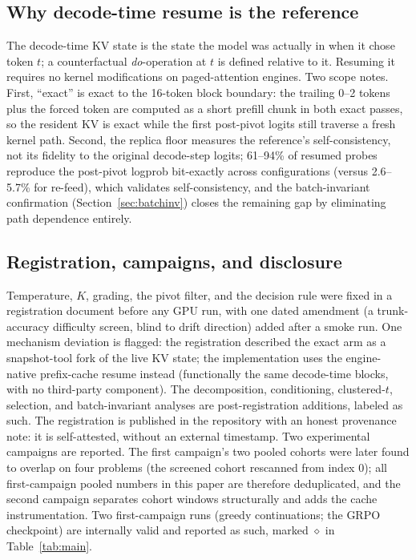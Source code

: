 \documentclass[11pt]{article}
\begin{document}
\subsection{Why decode-time resume is the reference}

The decode-time KV state is the state the model was actually in when it
chose token $t$; a counterfactual \emph{do}-operation at $t$ is defined
relative to it. Resuming it requires no kernel modifications on
paged-attention engines. Two scope notes. First, ``exact'' is exact to the
16-token block boundary: the trailing 0--2 tokens plus the forced token are
computed as a short prefill chunk in both exact passes, so the resident KV
is exact while the first post-pivot logits still traverse a fresh kernel
path. Second, the replica floor measures the reference's self-consistency,
not its fidelity to the original decode-step logits; 61--94\% of resumed
probes reproduce the post-pivot logprob bit-exactly across configurations
(versus 2.6--5.7\% for re-feed), which validates self-consistency, and the
batch-invariant confirmation (Section~\ref{sec:batchinv}) closes the
remaining gap by eliminating path dependence entirely.

\subsection{Registration, campaigns, and disclosure}

Temperature, $K$, grading, the pivot filter, and the decision rule were
fixed in a registration document before any GPU run, with one dated
amendment (a trunk-accuracy difficulty screen, blind to drift direction)
added after a smoke run. One mechanism deviation is flagged: the
registration described the exact arm as a snapshot-tool fork of the live
KV state; the implementation uses the engine-native prefix-cache resume
instead (functionally the same decode-time blocks, with no third-party
component). The decomposition, conditioning, clustered-$t$, selection, and
batch-invariant analyses are post-registration additions, labeled as
such. The registration is published in the repository with an honest
provenance note: it is self-attested, without an external timestamp. Two experimental campaigns are reported. The first campaign's
two pooled cohorts were later found to overlap on four problems (the
screened cohort rescanned from index 0); all first-campaign pooled numbers
in this paper are therefore deduplicated, and the second campaign separates
cohort windows structurally and adds the cache instrumentation. Two
first-campaign runs (greedy continuations; the GRPO checkpoint) are
internally valid and reported as such, marked $\diamond$ in
Table~\ref{tab:main}.
\end{document}

